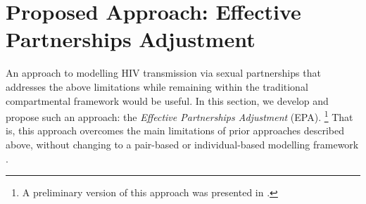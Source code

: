 \section{Proposed Approach: Effective Partnerships Adjustment}\label{foi.prop}
An approach to modelling HIV transmission via sexual partnerships
that addresses the above limitations
while remaining within the traditional compartmental framework would be useful.
In this section, we develop and propose such an approach:
the \emph{Effective Partnerships Adjustment} (EPA).%
\footnote{A preliminary version of this approach was presented in \cite{Knight2022smdm}.}
That is, this approach overcomes
the main limitations of prior approaches described above,
without changing to a pair-based or individual-based modelling framework \cite{Rao2021}.
